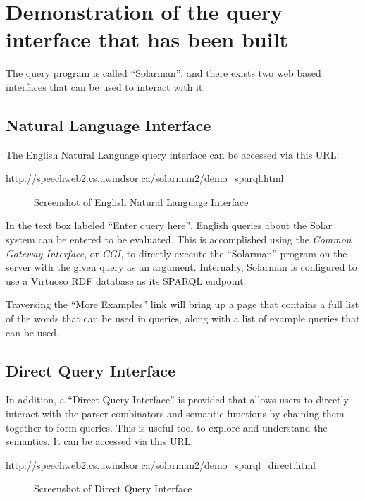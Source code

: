 \documentclass[../main.tex]{subfiles}
\begin{document}
\chapter{Demonstration of the query interface that has been built}
\label{chapter:demonstration}

The query program is called ``Solarman'', and there exists two web based interfaces that can be used to interact with it.

\section{Natural Language Interface}

The English Natural Language query interface can be accessed via this URL:

\url{http://speechweb2.cs.uwindsor.ca/solarman2/demo_sparql.html}


\begin{figure}[h]
\centering
{}
\caption{Screenshot of English Natural Language Interface}
\end{figure}
In the text box labeled ``Enter query here'', English queries about the Solar system can be entered to be evaluated.  This is accomplished using the {\em Common Gateway Interface}, or {\em CGI}, to directly execute the ``Solarman'' program on the server with the given query as an argument.  Internally, Solarman is configured to use a Virtuoso\cite{virtuoso} RDF database as its SPARQL endpoint.

Traversing the ``More Examples'' link will bring up a page that contains a full list of the words that can be used in queries, along with a list of example queries that can be used.


\section{Direct Query Interface}

In addition, a ``Direct Query Interface'' is provided that allows users to directly interact with the parser combinators and semantic functions by chaining them together to form queries.  This is useful tool to explore and understand the semantics.  It can be accessed via this URL:

\url{http://speechweb2.cs.uwindsor.ca/solarman2/demo_sparql_direct.html}

\begin{figure}[h]
	\centering
	\caption{Screenshot of Direct Query Interface}
\end{figure}
\end{document}
